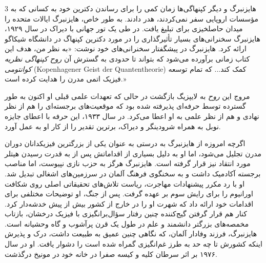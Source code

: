 \documentclass[11pt,a4paper]{article}
\begin{document}
\begin{multicols}{3}
هایزنبرگ و دیگر کپنهاگی‌ها زمان کمی را برای رساندن دکترین خود به کسانی که به مؤسسات اروپایی سفر نمی‌کردند، هدر دادند. به طور خاص، هایزنبرگ ایالات متحده را میدان حاصلخیزی برای تبلیغ یافت. در طی یک تور جهانی با دیراک در سال ۱۹۲۹، هایزنبرگ سخنرانی‌های بسیار تأثیرگذاری را در مورد دکترین کپنهاگ در دانشگاه شیکاگو ارائه کرد. هایزنبرگ در پیشگفتار سخنرانی‌های خود نوشت: «به نظر من، هدف این کتاب زمانی برآورده می‌شود که بتواند تا حدودی به گسترش آن \textit{روح کپنهاگی نظریه کوانتومی} (Kopenhagener Geist der Quantentheorie) کمک کند... که تمام توسعه فیزیک اتمی مدرن را هدایت کرده است.»

مروج این \textit{روح} به لایپزیگ بازگشت در حالی که تعهدات علمی قبلی او اکنون به طور گسترده توسط حرفه‌ای پذیرفته شده بود که موقعیت‌های برجسته‌ای را هم از نظر نهادی و هم از نظر علمی به او اعطا می‌کرد. در سال ۱۹۳۳، این حرفه با اعطای جایزه نوبل به همراه شرودینگر و دیراک، برترین تقدیر را از کار او به عمل آورد.

اگرچه امروزه از هایزنبرگ به درستی به عنوان یکی از بزرگترین فیزیکدانان دوران مدرن تجلیل می‌شود، اما او به دلیل بسیاری از اقداماتش پس از به قدرت رسیدن هیتلر مورد انتقاد نیز قرار گرفته است. هایزنبرگ هرگز به حزب نازی نپیوست، اما مناصب برجسته آکادمیک داشت و به سخنگوی فرهنگ آلمان در سرزمین‌های اشغالی تبدیل شد. او با رد مکرر پیشنهادات مهاجرت، ریاست تلاش‌های تحقیقاتی اصلی روی شکافت اورانیوم را برای رایش سوم بر عهده گرفت. پس از جنگ، او توضیحات مختلفی برای اقدامات خود ارائه داد که شهرت او را در خارج از کشور بیش از پیش خدشه‌دار کرد. کنار هم قرار گرفتن گیج‌کننده چنین رفتار سؤال‌برانگیزی با فیزیک درخشان، بازتاب مخمصه‌های بزرگتر دانشمند و علم در طول یک قرن پرآشوب و گاه وحشیانه است. هایزنبرگ، فرزند وفادار آلمان، که نگاهی چنین عمیق به طبیعت داشت، درک و پذیرش اینکه کشورش تا چه حد به طرز غم‌انگیزی گمراه شده است را دشوار یافت. او در سال ۱۹۷۶ بر اثر سرطان کلیه و کیسه صفرا در خانه خود در مونیخ درگذشت.

\vspace{1em}
\noindent{}

\end{multicols}
\end{document}
